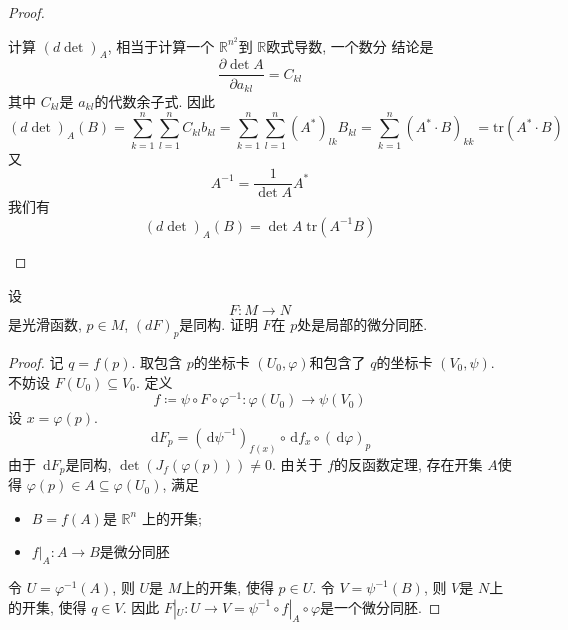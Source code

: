 \documentclass[../main.tex]{subfiles}
\begin{document}
\begin{proof}
\begin{enumerate}
\[    \]计算 \(  \left( d \det  \right)_{A}   \), 相当于计算一个 \(  \mathbb{R} ^{n^{2}}  \)到 \(  \mathbb{R}   \)欧式导数, 一个数分 结论是 \[
    \frac{\partial \det A}{  \partial a_{kl}}= C_{kl}
    \]其中 \(  C_{kl}  \)是 \(  a_{kl}  \)的代数余子式.   
        因此 \[
    \left( d \det  \right)_{A}\left( B \right)= \sum _{k= 1}^{n}\sum _{l = 1}^{n}C_{kl}b_{kl}  = \sum _{k= 1}^{n}\sum _{l = 1}^{n}\left( A^{*} \right)_{lk}B_{kl} = \sum _{k= 1}^{n}\left( A^{*}\cdot B \right)_{kk}=  \mathrm{tr}\left( A^{*}\cdot B \right) 
      \]又 \[
      A^{-1} = \frac{1 }{\det A } A^{*} 
      \]我们有 \[
      \left( d \det \right)_{A}\left( B \right)= \det A   \;\mathrm{tr}\left( A^{-1} B \right)   
      \]  
  \end{enumerate}
  
\end{proof}
\begin{exercise}{}{}
    设 \[
    F:M\to N
    \]是光滑函数, \(  p \in M  \), \(  \left( dF \right)_{p}   \)是同构. 证明 \(  F  \)在 \(  p  \)处是局部的微分同胚.    
\end{exercise} 

\begin{proof}
    记 \(  q= f\left( p \right)   \). 取包含 \(  p  \)的坐标卡 \(  \left( U_0, \varphi  \right)   \)和包含了 \(  q  \)的坐标卡 \(  \left( V_0,\psi  \right)   \). 不妨设      \(  F\left( U_0 \right)\subseteq V_0   \). 定义  \[
    f\coloneqq \psi \circ F\circ  \varphi ^{-1} :  \varphi \left( U_0 \right)\to \psi \left( V_0 \right)  
    \]设 \(  x=  \varphi \left( p \right)   \).  \[
    \,\mathrm{d} F_{p}= \left( \,\mathrm{d} \psi ^{-1}  \right)_{f\left( x \right) }\circ \,\mathrm{d} f_{x}\circ \left( \,\mathrm{d}  \varphi  \right)_{p}  
    \]由于 \(  \,\mathrm{d} F_{p}  \)是同构, \(  \det \left( J_{f}\left(  \varphi \left( p \right)  \right)  \right)\neq 0   \). 由关于 \(  f  \)的反函数定理, 存在开集 \(  A  \)使得 \(   \varphi \left( p \right)\in A\subseteq  \varphi \left( U_0 \right)    \), 满足
    \begin{itemize}
        \item \(  B= f\left( A \right)   \)是 \(  \mathbb{R} ^{n}  \)  上的开集;
        \item \(  f|_{A}:A\to B  \)是微分同胚
    \end{itemize}
         令 \(  U=  \varphi ^{-1} \left( A \right)   \), 则 \(  U  \)是 \(  M  \)上的开集, 使得 \(  p \in U  \). 令 \(  V= \psi ^{-1} \left( B \right)   \), 则 \(  V  \)是 \(  N  \)上的开集, 使得 \(  q \in V  \). 因此 \(  F|_{U}:U\to V  = \psi ^{-1} \circ f|_{A}\circ  \varphi \)是一个微分同胚.         
\end{proof}
\end{document}
